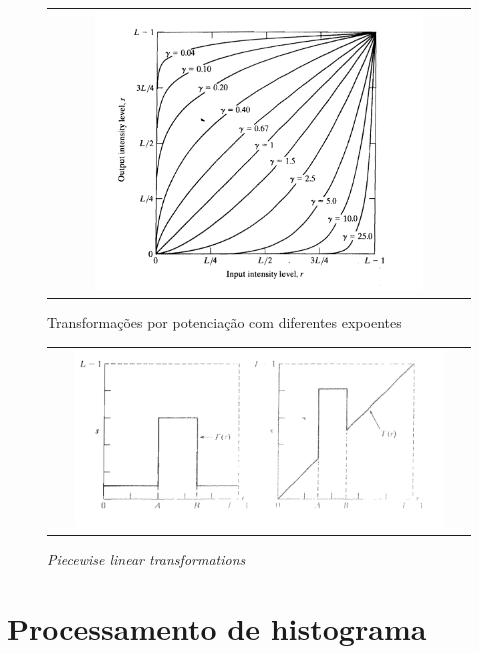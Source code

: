\begin{figure}[!h]
  \begin{center}
    \begin{tabular}{c}
      \includegraphics[width=0.8\textwidth]{images/03/04.png}
    \end{tabular}
  \end{center}
  \caption{\label{fig:power} Transformações por potenciação com diferentes expoentes}
\end{figure}

\clearpage

\begin{figure}[!h]
  \begin{center}
    \begin{tabular}{c}
      \includegraphics[width=0.9\textwidth]{images/03/05.png}
    \end{tabular}
  \end{center}
  \caption{\label{fig:piece} \textit{Piecewise linear transformations}}
\end{figure}


\section{Processamento de histograma}

